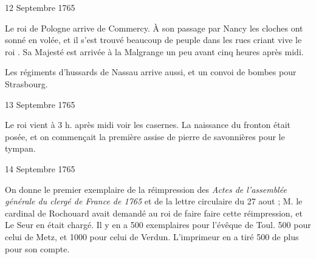                      \begin{diary}{12 Septembre 1765}{}


                           Le roi de Pologne arrive de
                              Commercy.
                           À son passage par Nancy les
                           cloches ont sonné
                           en volée, et il s'est trouvé beaucoup de peuple
                           dans les rues criant \og vive le roi \fg{}. Sa Majesté est
                           arrivée à la Malgrange un
                           peu avant cinq
                           heures après midi. \bigskip


                         Les régiments d'hussards de Nassau
                           arrive aussi,
                           et un convoi de bombes pour Strasbourg. \bigskip


                     \end{diary}

                     \begin{diary}{13 Septembre 1765}{}


                           Le roi vient à 3 h. après midi voir les
                              casernes. La naissance du fronton était
                           posée, et on commençait la première
                           assise de pierre de savonnières pour le
                           tympan. \bigskip


                     \end{diary}

                     \begin{diary}{14 Septembre 1765}{}

                         On donne le premier exemplaire de la
                           réimpression des \emph{Actes de l'assemblée
                                 générale
                                 du clergé de France de 1765} et de la lettre
                           circulaire du 27 aout ; M. le cardinal
                              de Rochouard avait demandé au roi de
                           faire faire cette réimpression, et Le
                              Seur
                           en était chargé. Il y en a 500 exemplaires
                           pour l'évêque de Toul. 500
                           pour celui de Metz, et 1000 pour celui
                              de Verdun.
                           L'imprimeur en a tiré 500 de plus
                           pour son compte. \bigskip


                     \end{diary}

